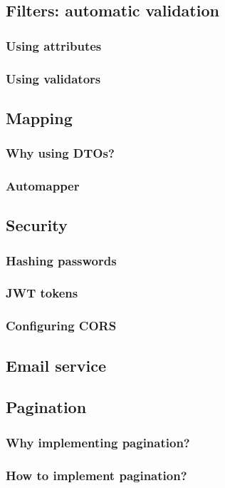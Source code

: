     \subsection{Filters: automatic validation}
        \subsubsection{Using attributes}
        \subsubsection{Using validators}
    \subsection{Mapping}
        \subsubsection{Why using DTOs?}
        \subsubsection{Automapper}
    \subsection{Security}
        \subsubsection{Hashing passwords}
        \subsubsection{JWT tokens}
        \subsubsection{Configuring CORS}
    \subsection{Email service}
    \subsection{Pagination}
        \subsubsection{Why implementing pagination?}
        \subsubsection{How to implement pagination?}
